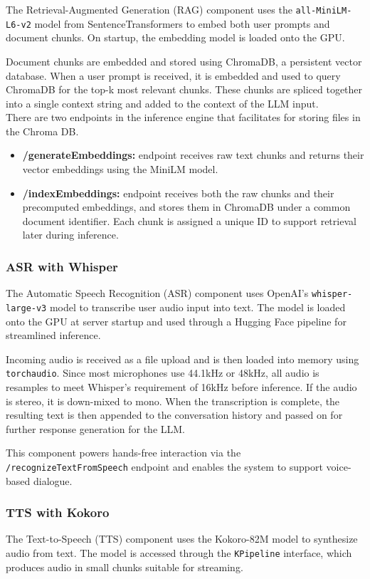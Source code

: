 \documentclass[twocolumn]{article}
\begin{document}
The Retrieval-Augmented Generation (RAG) component uses the \texttt{all-MiniLM-L6-v2} model from SentenceTransformers to embed both user prompts and document chunks. On startup, the embedding model is loaded onto the GPU.

Document chunks are embedded and stored using ChromaDB\cite{chromadb2023}, a persistent vector database. When a user prompt is received, it is embedded and used to query ChromaDB for the top-k most relevant chunks. These chunks are spliced together into a single context string and added to the context of the LLM input.\\
There are two endpoints in the inference engine that facilitates for storing files in the Chroma DB.
\begin{itemize}
    \item \textbf{/generateEmbeddings:} endpoint receives raw text chunks and returns their vector embeddings using the MiniLM model.
    \item \textbf{/indexEmbeddings:} endpoint receives both the raw chunks and their precomputed embeddings, and stores them in ChromaDB under a common document identifier. Each chunk is assigned a unique ID to support retrieval later during inference.
\end{itemize}

\subsubsection{ASR with Whisper}
The Automatic Speech Recognition (ASR) component uses OpenAI’s \texttt{whisper-large-v3}\cite{radford2022whisper} model to transcribe user audio input into text. The model is loaded onto the GPU at server startup and used through a Hugging Face pipeline for streamlined inference.

Incoming audio is received as a file upload and is then loaded into memory using \texttt{torchaudio}\cite{torchaudio}. Since most microphones use 44.1kHz or 48kHz, all audio is resamples to meet Whisper's requirement of 16kHz before inference. If the audio is stereo, it is down-mixed to mono. When the transcription is complete, the resulting text is then appended to the conversation history and passed on for further response generation for the LLM.

This component powers hands-free interaction via the \texttt{/recognizeTextFromSpeech} endpoint and enables the system to support voice-based dialogue.

\subsubsection{TTS with Kokoro}
The Text-to-Speech (TTS) component uses the Kokoro-82M model\cite{kokoro82m} to synthesize audio from text. The model is accessed through the \texttt{KPipeline} interface, which produces audio in small chunks suitable for streaming.
\end{document}
